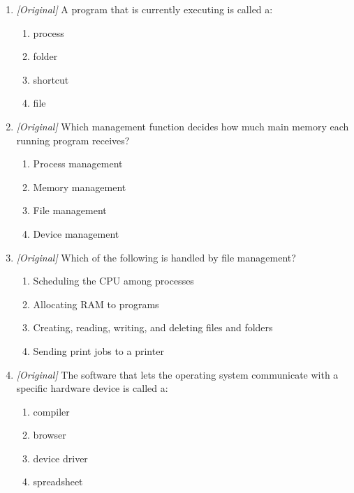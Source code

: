 \begin{enumerate}[label=\textbf{Q\arabic*.}, leftmargin=*]
  loads the operating system during startup?
  \begin{enumerate}[label=\Alph*.]
    \item Device driver
    \item Kernel
    \item BIOS/UEFI
    \item Compiler
  \end{enumerate}
\item \textit{[Original]} A program that is currently executing is called a:
  \begin{enumerate}[label=\Alph*.]
    \item process
    \item folder
    \item shortcut
    \item file
  \end{enumerate}
\item \textit{[Original]} Which management function decides how much main
  memory each running program receives?
  \begin{enumerate}[label=\Alph*.]
    \item Process management
    \item Memory management
    \item File management
    \item Device management
  \end{enumerate}
\item \textit{[Original]} Which of the following is handled by file management?
  \begin{enumerate}[label=\Alph*.]
    \item Scheduling the CPU among processes
    \item Allocating RAM to programs
    \item Creating, reading, writing, and deleting files and folders
    \item Sending print jobs to a printer
  \end{enumerate}
\item \textit{[Original]} The software that lets the operating system
  communicate with a specific hardware device is called a:
  \begin{enumerate}[label=\Alph*.]
    \item compiler
    \item browser
    \item device driver
    \item spreadsheet
  \end{enumerate}

\end{enumerate}
